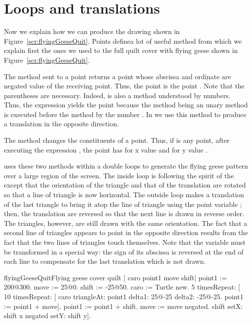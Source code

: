 \section{Loops and translations}
Now we explain how we can produce the drawing shown in Figure~\ref{scr:flyingGeeseQuit}. 
Points definea lot of useful method from which we explain first the ones we used to the full quilt cover
with flying geese shown in Figure~\ref{scr:flyingGeeseQuit}.

The method  sent to a point returns a point whose
abscissa and ordinate are negated value of the receiving
point. Thus, the point  is the point . Note that the
parentheses are necessary. Indeed,  is also a
method understood by numbers. Thus, the expression
 yields the point 
because the method  being an unary method 
is executed before the method  by the
number . In  we use this
method to produce a translation in the opposite direction.

The method  changes the constituents of a point.
Thus, if  is any point, after executing the expression
\ct{point\ setX: 200\ setY: 400}, the point has for x value  and for y value . 


 uses these two methods within a double loops
to generate the flying geese pattern over a large region
of the screen. The inside loop is following the spirit of the 
 except that the orientation of the triangle
and that of the translation are rotated so that a line of
triangle is now horizontal. The outside loop makes a translation
of the last triangle to bring it atop the line of triangle using
the point variable \ct{shift}; then, the translation are reversed so
that the next line is drawn in reverse order. The triangles,
however, are still drawn with the same orientation. The fact that
a second line of triangles appears to point in the opposite
direction results from the fact that the two lines of triangles
touch themselves. Note that the variable  must be
transformed in a special way: the sign of its abscissa is reversed
at the end of each line to compensate for the last translation
which is not drawn.

\begin{scriptfig}{flyingGeeseQuit}{Flying geese cover quilt}
\label{scr:flyingGeeseQuit}
| caro point1 move shift|
point1 := 200@300.
move := 25@0.
shift := -25@50.
caro := Turtle new.
5 timesRepeat: [
   10 timesRepeat: [
       caro 
          triangleAt: point1 
          delta1: 25@-25 
          delta2: -25@-25.
       point1 := point1 + move].
   point1 := point1 + shift.
   move := move negated.
   shift setX: shift x negated setY: shift y].
\end{scriptfig}

